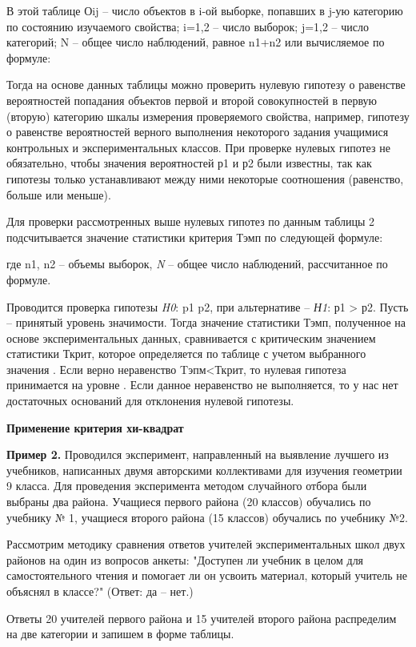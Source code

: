 \documentclass[12pt]{article}
\begin{document}
В этой таблице Оij – число объектов в i-ой выборке, попавших в j-ую категорию по состоянию изучаемого свойства; i=1,2 – число выборок; j=1,2 – число категорий; N – общее число наблюдений, равное  n1+n2 или вычисляемое по формуле:

Тогда на основе данных таблицы  можно проверить нулевую гипотезу о равенстве вероятностей попадания объектов первой и второй совокупностей в первую (вторую) категорию шкалы измерения проверяемого свойства, например, гипотезу о равенстве вероятностей верного выполнения некоторого задания учащимися контрольных и экспериментальных классов.
При проверке нулевых гипотез не обязательно, чтобы значения вероятностей р1 и р2 были известны, так как гипотезы только устанавливают между ними некоторые соотношения (равенство, больше или меньше).

Для проверки рассмотренных выше нулевых гипотез по данным таблицы 2 подсчитывается значение статистики критерия Тэмп по следующей формуле:
                                            
где n1, n2 – объемы выборок, \textit{N} – общее число наблюдений, рассчитанное по формуле.

Проводится проверка гипотезы \textit{H0}: p1  p2, при альтернативе – \textit{Н1}: р1 > р2. Пусть  – принятый уровень значимости. Тогда значение статистики Тэмп, полученное на основе экспериментальных данных, сравнивается с критическим значением статистики Ткрит, которое определяется по таблице  с учетом выбранного значения  . Если верно неравенство Tэпм<Ткрит, то нулевая гипотеза принимается на уровне . Если данное неравенство не выполняется, то у нас нет достаточных оснований для отклонения нулевой гипотезы.

\medskip
\textbf{Применение критерия хи-квадрат}

\medskip
\textbf{Пример 2.} Проводился эксперимент, направленный на выявление лучшего из учебников, написанных двумя авторскими коллективами для изучения геометрии 9 класса. Для проведения эксперимента методом случайного отбора были выбраны два района. Учащиеся первого района (20 классов) обучались по учебнику № 1, учащиеся второго района (15 классов) обучались по учебнику №2.

Рассмотрим методику сравнения ответов учителей экспериментальных школ двух районов на один из вопросов анкеты: "Доступен ли учебник в целом для самостоятельного чтения и помогает ли он усвоить материал, который учитель не объяснял в классе?" (Ответ: да – нет.)

Ответы 20 учителей первого района и 15 учителей второго района распределим на две категории и запишем в форме таблицы.
\end{document}
